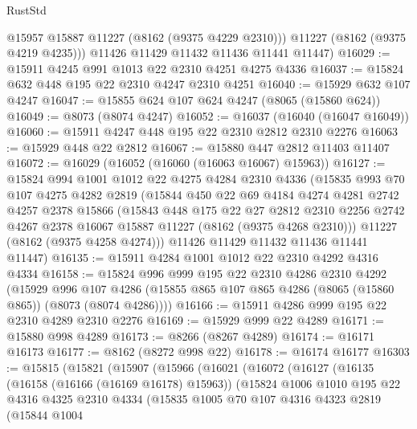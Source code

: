 \begin{lexlean}{RustStd}
\begin{coremodule}
          @15957
          @15887
          @11227
          (@8162 (@9375 @4229 @2310)))
        @11227
        (@8162 (@9375 @4219 @4235)))
      @11426
      @11429
      @11432
      @11436
      @11441
      @11447)
@16029 := @15911 @4245 @991 @1013 @22 @2310 @4251 @4275 @4336
@16037 := @15824 @632 @448 @195 @22 @2310 @4247 @2310 @4251
@16040 := @15929 @632 @107 @4247
@16047 := @15855 @624 @107 @624 @4247 (@8065 (@15860 @624))
@16049 := @8073 (@8074 @4247)
@16052 := @16037 (@16040 (@16047 @16049))
@16060 := @15911 @4247 @448 @195 @22 @2310 @2812 @2310 @2276
@16063 := @15929 @448 @22 @2812
@16067 := @15880 @447 @2812 @11403 @11407
@16072 := @16029 (@16052 (@16060 (@16063 @16067) @15963))
@16127 := @15824
    @994
    @1001
    @1012
    @22
    @4275
    @4284
    @2310
    @4336
    (@15835
      @993
      @70
      @107
      @4275
      @4282
      @2819
      (@15844
        @450
        @22
        @69
        @4184
        @4274
        @4281
        @2742
        @4257
        @2378
        @15866
        (@15843
          @448
          @175
          @22
          @27
          @2812
          @2310
          @2256
          @2742
          @4267
          @2378
          @16067
          @15887
          @11227
          (@8162 (@9375 @4268 @2310)))
        @11227
        (@8162 (@9375 @4258 @4274)))
      @11426
      @11429
      @11432
      @11436
      @11441
      @11447)
@16135 := @15911 @4284 @1001 @1012 @22 @2310 @4292 @4316 @4334
@16158 := @15824
    @996
    @999
    @195
    @22
    @2310
    @4286
    @2310
    @4292
    (@15929
      @996
      @107
      @4286
      (@15855 @865 @107 @865 @4286 (@8065 (@15860 @865)) (@8073 (@8074 @4286))))
@16166 := @15911 @4286 @999 @195 @22 @2310 @4289 @2310 @2276
@16169 := @15929 @999 @22 @4289
@16171 := @15880 @998 @4289
@16173 := @8266 (@8267 @4289)
@16174 := @16171 @16173
@16177 := @8162 (@8272 @998 @22)
@16178 := @16174 @16177
@16303 := @15815
    (@15821
      (@15907
        (@15966
          (@16021
            (@16072
              (@16127
                (@16135
                  (@16158 (@16166 (@16169 @16178) @15963))
                  (@15824
                    @1006
                    @1010
                    @195
                    @22
                    @4316
                    @4325
                    @2310
                    @4334
                    (@15835
                      @1005
                      @70
                      @107
                      @4316
                      @4323
                      @2819
                      (@15844
                        @1004

\end{coremodule}
\end{lexlean}
